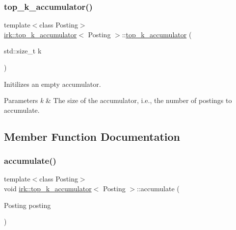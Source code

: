 \subsubsection{\texorpdfstring{top\+\_\+k\+\_\+accumulator()}{top\_k\_accumulator()}}
{\footnotesize\ttfamily template$<$class Posting$>$ \\
\mbox{\hyperlink{classirk_1_1top__k__accumulator}{irk\+::top\+\_\+k\+\_\+accumulator}}$<$ Posting $>$\+::\mbox{\hyperlink{classirk_1_1top__k__accumulator}{top\+\_\+k\+\_\+accumulator}} (\begin{DoxyParamCaption}\item[{std\+::size\+\_\+t}]{k }\end{DoxyParamCaption})\hspace{0.3cm}{\ttfamily [inline]}}



Initilizes an empty accumulator. 


\begin{DoxyParams}{Parameters}
{\em k} & The size of the accumulator, i.\+e., the number of postings to accumulate. \\
\hline
\end{DoxyParams}


\subsection{Member Function Documentation}
\mbox{\label{classirk_1_1top__k__accumulator_a81e919a61cc0fd05dcb77c8fad56fd82}} 
\subsubsection{\texorpdfstring{accumulate()}{accumulate()}}
{\footnotesize\ttfamily template$<$class Posting$>$ \\
void \mbox{\hyperlink{classirk_1_1top__k__accumulator}{irk\+::top\+\_\+k\+\_\+accumulator}}$<$ Posting $>$\+::accumulate (\begin{DoxyParamCaption}\item[{Posting}]{posting }\end{DoxyParamCaption})\hspace{0.3cm}{\ttfamily [inline]}}



